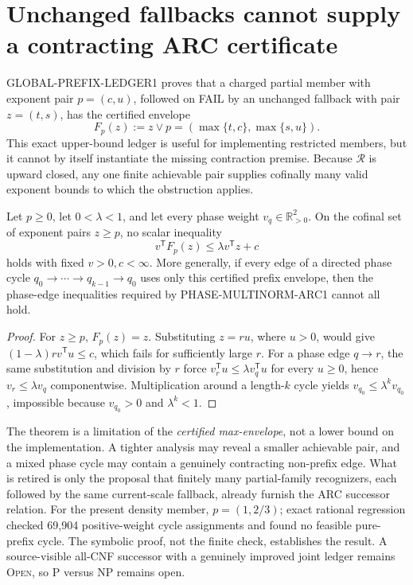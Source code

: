 \section{Unchanged fallbacks cannot supply a contracting ARC certificate}
GLOBAL-PREFIX-LEDGER1 proves that a charged partial member with exponent
pair \(p=(c,u)\), followed on FAIL by an unchanged fallback with pair
\(z=(t,s)\), has the certified envelope
\[
 F_p(z):=z\vee p=(\max\{t,c\},\max\{s,u\}).
\]
This exact upper-bound ledger is useful for implementing restricted members,
but it cannot by itself instantiate the missing contraction premise.  Because
\(\mathcal R\) is upward closed, any one finite achievable pair supplies
cofinally many valid exponent bounds to which the obstruction applies.

\begin{theorem}
Let \(p\ge0\), let \(0<\lambda<1\), and let every phase weight
\(v_q\in\mathbb R_{>0}^2\).  On the cofinal set of exponent pairs
\(z\ge p\), no scalar inequality
\[
 v^{\mathsf T}F_p(z)\le\lambda v^{\mathsf T}z+c
\]
holds with fixed \(v>0,c<\infty\).  More generally, if every edge of a
directed phase cycle \(q_0\to\cdots\to q_{k-1}\to q_0\) uses only this
certified prefix envelope, then the phase-edge inequalities required by
PHASE-MULTINORM-ARC1 cannot all hold.
\end{theorem}
\begin{proof}
For \(z\ge p\), \(F_p(z)=z\).  Substituting \(z=ru\), where \(u>0\),
would give
\((1-\lambda)r v^{\mathsf T}u\le c\), which fails for sufficiently large
\(r\).  For a phase edge \(q\to r\), the same substitution and division by
\(r\) force \(v_r^{\mathsf T}u\le\lambda v_q^{\mathsf T}u\) for every
\(u\ge0\), hence \(v_r\le\lambda v_q\) componentwise.  Multiplication around
a length-\(k\) cycle yields \(v_{q_0}\le\lambda^k v_{q_0}\), impossible
because \(v_{q_0}>0\) and \(\lambda^k<1\).
\end{proof}

The theorem is a limitation of the \emph{certified max-envelope}, not a
lower bound on the implementation.  A tighter analysis may reveal a smaller
achievable pair, and a mixed phase cycle may contain a genuinely contracting
non-prefix edge.  What is retired is only the proposal that finitely many
partial-family recognizers, each followed by the same current-scale fallback,
already furnish the ARC successor relation.  For the present density member,
\(p=(1,2/3)\); exact rational regression checked 69,904 positive-weight cycle
assignments and found no feasible pure-prefix cycle.  The symbolic proof,
not the finite check, establishes the result.  A source-visible all-CNF
successor with a genuinely improved joint ledger remains \textsc{Open}, so
P versus NP remains open.
